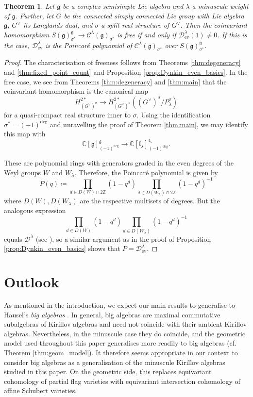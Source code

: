 \documentclass{amsart}
\newcommand{\C}{\mathbb{C}}
\newcommand{\Kir}{\mathcal{C}}
\newcommand{\D}{\mathcal{D}}
\newcommand{\g}{\mathfrak{g}}
\newcommand{\el}{\mathfrak{l}}
\newcommand{\Z}{\mathbb{Z}}
\newcommand{\inv}{^{-1}}
\theoremstyle{definition}
\theoremstyle{plain}
\newtheorem{thm}[defn]{Theorem}
\theoremstyle{remark}
\begin{document}
\begin{thm}
    Let $\g$ be a complex semisimple Lie algebra and $\lambda$ a minuscule weight of $\g$. Further, let $G$ be the connected simply connected Lie group with Lie algebra $\g$, $G^\vee$ its Langlands dual, and $\sigma$ a split real structure of $G^\vee$. Then the coinvariant homomorphism $S(\g)^\g_{\sigma^*}\to \Kir^\lambda(\g)_{\sigma^*}$ is free if and only if $\D^\lambda_{\mathrm{ev}}(1) \ne 0$. If this is the case, $\D^\lambda_{\mathrm{ev}}$ is the Poincaré polynomial of $\Kir^\lambda(\g)_{\sigma^*}$ over $S(\g)^\g_{\sigma^*}$.
\end{thm}
\begin{proof}
    The characterisation of freeness follows from Theorems \ref{thm:degeneracy} and \ref{thm:fixed_point_count} and Proposition \ref{prop:Dynkin_even_basics}. In the free case, we see from Theorems \ref{thm:degeneracy} and \ref{thm:main} that the coinvariant homomorphism is the canonical map
    $$
        H^{2*}_{(G^\vee)^\sigma}
        \to
        H^{2*}_{(G^\vee)^\sigma}((G^\vee)^\sigma/P_\lambda^\sigma)
    $$
    for a quasi-compact real structure inner to $\sigma$. Using the identification $\sigma^* = (-1)^{\deg}$ and unravelling the proof of Theorem \ref{thm:main}, we may identify this map with
    $$
        \C[\g]^\g_{(-1)^{\deg}}
        \to
        \C[\el_\lambda]^{\el_\lambda}_{(-1)^{\deg}}.
    $$
    
    These are polynomial rings with generators graded in the even degrees of the Weyl groups $W$ and $W_\lambda$. Therefore, the Poincaré polynomial is given by
    $$
        P(q)
        \coloneqq
        \prod_{d \in D(W)\cap 2\Z}\!\!\!\!(1-q^d)
        \prod_{d \in D(W_\lambda)\cap 2\Z}\!\!\!\!(1-q^d)\inv
    $$
    where $D(W), D(W_\lambda)$ are the respective multisets of degrees. But the analogous expression
    $$
        \prod_{d \in D(W)}\!\!\!(1-q^d)
        \prod_{d \in D(W_\lambda)}\!\!\!(1-q^d)\inv
    $$
    equals $\D^\lambda$ (see \cite[Prop.\,3.7]{Panyushev2004_endoj}), so a similar argument as in the proof of Proposition \ref{prop:Dynkin_even_basics} shows that $P=\D^\lambda_{\mathrm{ev}}$.
\end{proof}

\section{Outlook}
\label{sec:outlook}
As mentioned in the introduction, we expect our main results to generalise to Hausel's 
\emph{big algebras} \cite{Hausel2024_avatars}. In general, big algebras are maximal commutative subalgebras of Kirillov algebras and need not coincide with their ambient Kirillov algebras. Nevertheless, in the minuscule case they do coincide, and the geometric model used throughout this paper generalises more readily to big algebras (cf.\,Theorem \ref{thm:geom_model}). It therefore seems appropriate in our context to consider big algebras as a generalisation of the minuscule Kirillov algebras studied in this paper. On the geometric side, this replaces equivariant cohomology of partial flag varieties with equivariant intersection cohomology of affine Schubert varieties. 
\end{document}
